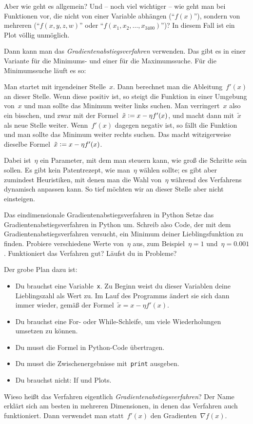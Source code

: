 \documentclass{blatt}
\newcommand{\defeq}{\vcentcolon=}
\begin{document}
Aber wie geht es allgemein? Und -- noch viel wichtiger -- wie geht man bei
Funktionen vor, die nicht von einer Variable abhängen ("`$f(x)$"'), sondern von
mehreren ("`$f(x,y,z,w)$"' oder "`$f(x_1,x_2,\ldots,x_{3400})$"')? In diesem Fall
ist ein Plot völlig unmöglich.

Dann kann man das \emph{Gradientenabstiegsverfahren} verwenden. Das gibt es in
einer Variante für die Minimums- und einer für die Maximumssuche. Für die
Minimumssuche läuft es so:

Man startet mit irgendeiner Stelle~$x$. Dann berechnet man die Ableitung~$f'(x)$
an dieser Stelle. Wenn diese positiv ist, so steigt die Funktion in einer
Umgebung von~$x$ und man sollte das Minimum weiter links suchen. Man
verringert~$x$ also ein bisschen, und zwar mit der Formel~$\tilde x \defeq x - \eta
f'(x)$, und macht dann mit~$\tilde x$ als neue Stelle weiter. Wenn~$f'(x)$ dagegen
negativ ist, so fällt die Funktion und man sollte das Minimum weiter rechts
suchen. Das macht witzigerweise dieselbe Formel~$\tilde x \defeq x - \eta f'(x)$.

Dabei ist~$\eta$ ein Parameter, mit dem man steuern kann, wie groß die Schritte
sein sollen. Es gibt kein Patentrezept, wie man~$\eta$ wählen sollte; es gibt
aber zumindest Heuristiken, mit denen man die Wahl von~$\eta$ während des
Verfahrens dynamisch anpassen kann. So tief möchten wir an dieser Stelle aber
nicht einsteigen.

\begin{aufgabe}{Das eindimensionale Gradientenabstiegsverfahren in Python}
Setze das Gradientenabstiegsverfahren in Python um. Schreib also Code, der mit
dem Gradientenabstiegsverfahren versucht, ein Minimum deiner Lieblingsfunktion
zu finden. Probiere verschiedene Werte von~$\eta$ aus, zum Beispiel~$\eta = 1$
und~$\eta = 0.001$. Funktioniert das Verfahren gut? Läufst du in Probleme?

Der grobe Plan dazu ist:
\begin{itemize}
\item Du brauchst eine Variable~\texttt{x}. Zu Beginn weist du
dieser Variablen deine Lieblingszahl als Wert zu. Im Lauf des Programms ändert
sie sich dann immer wieder, gemäß der Formel~$\tilde x = x - \eta f'(x)$.
\item Du brauchst eine For- oder While-Schleife, um viele Wiederholungen umsetzen zu
können.
\item Du musst die Formel in Python-Code übertragen.
\item Du musst die Zwischenergebnisse mit~\texttt{print} ausgeben.
\item Du brauchst nicht: If und Plots.
\end{itemize}
\vspace{-1em}
\end{aufgabe}

Wieso heißt das Verfahren eigentlich \emph{Gradientenabstiegsverfahren}? Der
Name erklärt sich am besten in mehreren Dimensionen, in denen das Verfahren
auch funktioniert. Dann verwendet man statt~$f'(x)$ den Gradienten~$\nabla
f(x)$.
\end{document}
